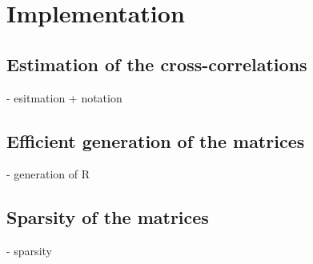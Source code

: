 \documentclass[a4paper, openany, oneside]{memoir}
\begin{document}
\section{Implementation}
\label{sec:reconstruction-implementation}

\subsection{Estimation of the cross-correlations}
\label{sub:reconstruction-estimation}
- esitmation + notation

\subsection{Efficient generation of the matrices}
\label{sub:reconstruction-generation}
- generation of R

\subsection{Sparsity of the matrices}
\label{sub:reconstruction-sparsity}
- sparsity 
\end{document}

